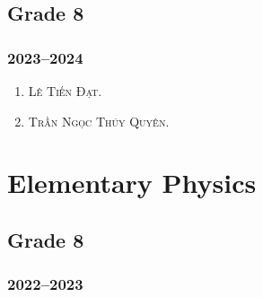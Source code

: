 \documentclass{article}
\begin{document}
\subsection{Grade 8}

\subsubsection{2023--2024}

\begin{enumerate}
	\item \textsc{Lê Tiến Đạt.}
	\item \textsc{Trần Ngọc Thúy Quyên.}
\end{enumerate}


\section{Elementary Physics}

\subsection{Grade 8}

\subsubsection{2022--2023}
\end{document}
